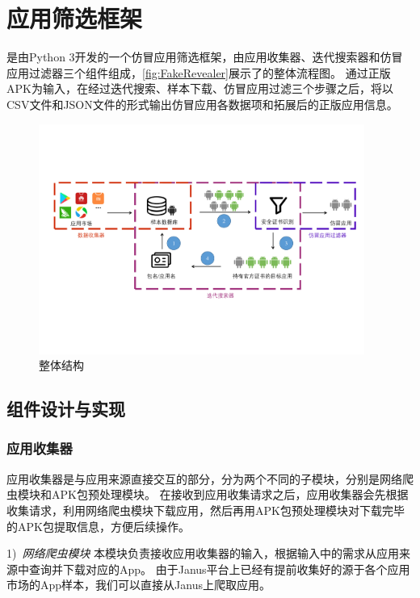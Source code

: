 \chapter{应用筛选框架\mytool}
\label{chp:fakerevealer}

\mytool 是由Python 3开发的一个仿冒应用筛选框架，由应用收集器、迭代搜索器和仿冒应用过滤器三个组件组成，\autoref{fig:FakeRevealer}展示了\mytool 的整体流程图。
通过正版APK为输入，\mytool 在经过迭代搜索、样本下载、仿冒应用过滤三个步骤之后，将以CSV文件和JSON文件的形式输出仿冒应用各数据项和拓展后的正版应用信息。

\begin{figure}[htbp]
	\centering
	\includegraphics[width=0.95\textwidth]{./Figures/edwin-fakerevealer}
	\caption{\mytool 整体结构}
	\label{fig:FakeRevealer}
	\vspace{-3mm}
\end{figure}


\section{组件设计与实现}


\subsection{应用收集器}
应用收集器是与应用来源直接交互的部分，分为两个不同的子模块，分别是网络爬虫模块和APK包预处理模块。
在接收到应用收集请求之后，应用收集器会先根据收集请求，利用网络爬虫模块下载应用，然后再用APK包预处理模块对下载完毕的APK包提取信息，方便后续操作。

1)\ \emph{网络爬虫模块} \quad
本模块负责接收应用收集器的输入，根据输入中的需求从应用来源中查询并下载对应的App。
由于Janus平台上已经有提前收集好的源于各个应用市场的App样本，我们可以直接从Janus上爬取应用。

